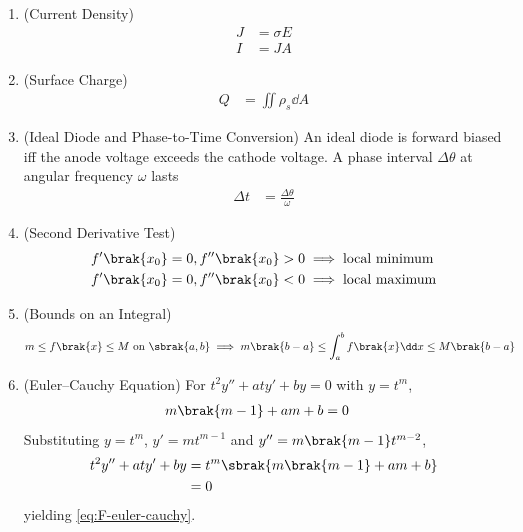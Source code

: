 \begin{enumerate}[label=\thesubsection.\arabic*, ref=\thesubsection.\theenumi, itemsep=0pt, leftmargin=0pt, labelwidth=0pt, itemindent=0pt, labelsep=1em, align=right]
\item (Current Density)
\begin{align}
J &= \sigma E
\\
I &= J A
\label{eq:F-J}
\end{align}

\item (Surface Charge)
\begin{align}
Q &= \iint \rho_s \dd A
\label{eq:F-charge}
\end{align}

\item (Ideal Diode and Phase-to-Time Conversion) An ideal diode is forward biased iff the anode voltage exceeds the cathode voltage. A phase interval $\Delta \theta$ at angular frequency $\omega$ lasts
\begin{align}
\Delta t &= \frac{\Delta \theta}{\omega}
\label{eq:F-angletime}
\end{align}

\item (Second Derivative Test)
\begin{align}
f'\brak{x_0} = 0, f''\brak{x_0} > 0 &\implies \text{local minimum}
\label{eq:F-second}
\\
f'\brak{x_0} = 0, f''\brak{x_0} < 0 &\implies \text{local maximum}
\end{align}

\item (Bounds on an Integral)
\begin{align}
m \le f\brak{x} \le M \text{ on } \sbrak{a, b} &\implies m\brak{b - a} \le \int_{a}^{b} f\brak{x} \dd x \le M\brak{b - a}
\label{eq:F-intbound}
\end{align}

\item (Euler--Cauchy Equation) For $t^2 y'' + a t y' + b y = 0$ with $y = t^m$,
\begin{align}
m\brak{m - 1} + a m + b &= 0
\label{eq:F-euler-cauchy}
\end{align}
\solution Substituting $y = t^m$, $y' = m t^{m-1}$ and $y'' = m\brak{m-1}t^{m-2}$,
\begin{align}
t^2 y'' + a t y' + b y &= t^m \sbrak{m\brak{m - 1} + a m + b}
\\
&= 0
\end{align}
yielding \eqref{eq:F-euler-cauchy}.


\end{enumerate}

